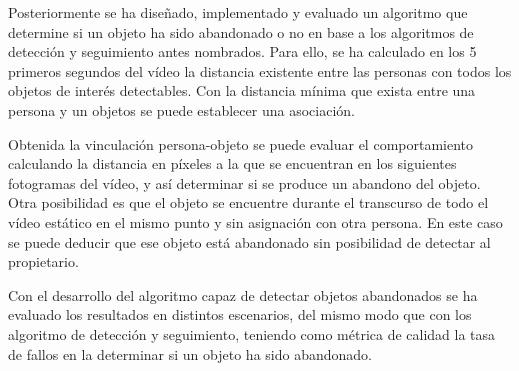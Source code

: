 Posteriormente se ha diseñado, implementado y evaluado un algoritmo que determine si un objeto ha sido abandonado o no en base a los algoritmos de detección y seguimiento antes nombrados. Para ello, se ha calculado en los 5 primeros segundos del vídeo la distancia existente entre las personas con todos los objetos de interés detectables. Con la distancia mínima que exista entre una persona y un objetos se puede establecer una asociación.

Obtenida la vinculación persona-objeto se puede evaluar el comportamiento calculando la distancia en píxeles a la que se encuentran en los siguientes fotogramas del vídeo, y así determinar si se produce un abandono del objeto. Otra posibilidad es que el objeto se encuentre durante el transcurso de todo el vídeo estático \cite{luna2018} en el mismo punto y sin asignación con otra persona. En este caso se puede deducir que ese objeto está abandonado sin posibilidad de detectar al propietario.

Con el desarrollo del algoritmo capaz de detectar objetos abandonados se ha evaluado los resultados en distintos escenarios, del mismo modo que con los algoritmo de detección y seguimiento, teniendo como métrica de calidad la tasa de fallos en la determinar si un objeto ha sido abandonado.
